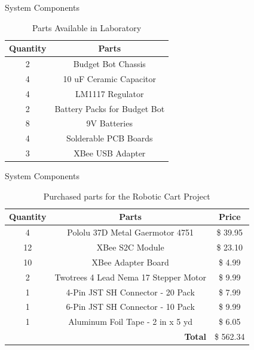 \documentclass{beamer}
\begin{document}
\begin{frame}{System Components}
  \begin{table}[h!]
      \centering
      \begin{tabular}{c|c}
          \toprule
          \textbf{Quantity} & \textbf{Parts}\\
          \toprule
          2 & Budget Bot Chassis\\
          4 & 10 uF Ceramic Capacitor\\
          4 & LM1117 Regulator\\
          2 & Battery Packs for Budget Bot\\
          8 & 9V Batteries\\
          4 & Solderable PCB Boards\\
          3 & XBee USB Adapter\\
          \bottomrule
      \end{tabular}
      \caption{Parts Available in Laboratory}
      \label{tab:Partslablist}
  \end{table}
\end{frame}

\begin{frame}{System Components}
  \begin{table}[h!]
    \centering
    \begin{tabular}{c|c|c}
      \toprule
      \textbf{Quantity} & \textbf{Parts} & \textbf{Price}\\
      \toprule
      4 & Pololu 37D Metal Gaermotor 4751 & \$ 39.95\\
      12 & XBee S2C Module & \$ 23.10\\
      10 & XBee Adapter Board & \$ 4.99\\
      2 & Twotrees 4 Lead Nema 17 Stepper Motor & \$ 9.99\\
      1 & 4-Pin JST SH Connector - 20 Pack & \$ 7.99\\
      1 & 6-Pin JST SH Connector - 10 Pack & \$ 9.99\\
      1 & Aluminum Foil Tape - 2 in x 5 yd & \$ 6.05\\
      \bottomrule
      \multicolumn{2}{r|}{\textbf{Total}} & \$ 562.34\\
      \bottomrule
    \end{tabular}
    \caption{Purchased parts for the Robotic Cart Project}
    \label{tab:Partslist}
  \end{table}
\end{frame}
\end{document}
